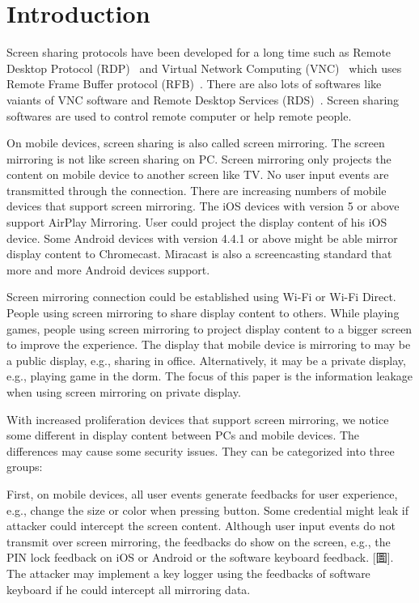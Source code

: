\chapter{Introduction}

Screen sharing protocols have been developed for a long time such as Remote Desktop Protocol (RDP)~\cite{RDP} and Virtual Network Computing (VNC)~\cite{VNC} which uses Remote Frame Buffer protocol (RFB)~\cite{RFB}. There are also lots of softwares like vaiants of VNC software and Remote Desktop Services (RDS)~\cite{RDS}. Screen sharing softwares are used to control remote computer or help remote people.

On mobile devices, screen sharing is also called screen mirroring. The screen mirroring is not like screen sharing on PC. Screen mirroring only projects the content on mobile device to another screen like TV. No user input events are transmitted through the connection. There are increasing numbers of mobile devices that support screen mirroring. The iOS devices with version 5 or above support AirPlay Mirroring. User could project the display content of his iOS device. Some Android devices with version 4.4.1 or above might be able mirror display content to Chromecast. Miracast is also a screencasting standard that more and more Android devices support.

Screen mirroring connection could be established using Wi-Fi or Wi-Fi Direct. People using screen mirroring to share display content to others. While playing games, people using screen mirroring to project display content to a bigger screen to improve the experience. The display that mobile device is mirroring to may be a public display, e.g., sharing in office. Alternatively, it may be a private display, e.g., playing game in the dorm. The focus of this paper is the information leakage when using screen mirroring on private display.

With increased proliferation devices that support screen mirroring, we notice some different in display content between PCs and mobile devices. The differences may cause some security issues. They can be categorized into three groups:

First, on mobile devices, all user events generate feedbacks for user experience, e.g., change the size or color when pressing button. Some credential might leak if attacker could intercept the screen content. Although user input events do not transmit over screen mirroring, the feedbacks do show on the screen, e.g., the PIN lock feedback on iOS or Android or the software keyboard feedback. [圖]. The attacker may implement a key logger using the feedbacks of software keyboard if he could intercept all mirroring data.

